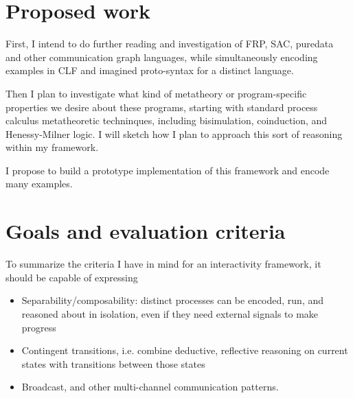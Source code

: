 \documentclass{article}
\begin{document}
\section{Proposed work}

First, I intend to do further reading and investigation of FRP, SAC,
puredata and other communication graph languages, while simultaneously
encoding examples in CLF and imagined proto-syntax for a distinct language.

Then I plan to investigate what kind of metatheory or program-specific
properties we desire about these programs, starting with standard process
calculus metatheoretic techninques, including bisimulation, coinduction,
and Henessy-Milner logic. I will sketch how I plan to approach this sort of
reasoning within my framework.

I propose to build a prototype implementation of this framework and encode
many examples.

\section{Goals and evaluation criteria}

To summarize the criteria I have in mind for an interactivity framework, it
should be capable of expressing
\begin{itemize}
\item Separability/composability: distinct processes can be encoded, run,
and reasoned about in isolation, even if they need external signals to make
progress
\item Contingent transitions, i.e. combine deductive, reflective reasoning
on current states with transitions between those states
\item Broadcast, and other multi-channel communication patterns.
\end{itemize}

\end{document}
